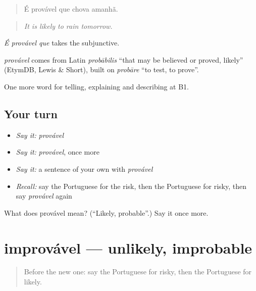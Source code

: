 \begin{quote}
É provável que chova amanhã.
\end{quote}

\begin{quote}
\emph{It is likely to rain tomorrow.}
\end{quote}

\emph{É provável que} takes the subjunctive.

\begin{cousinweb}
\emph{provável} comes from Latin \emph{probābilis} \textquotedblleft{}that may be believed or proved, likely\textquotedblright{} (EtymDB, Lewis \& Short), built on \emph{probāre} \textquotedblleft{}to test, to prove\textquotedblright{}.
\end{cousinweb}

\begin{grammarlens}[title={What you've built}]
One more word for telling, explaining and describing at B1.
\end{grammarlens}

\subsection*{Your turn}
\begin{itemize}
\raggedright
  \item \emph{Say it:} \emph{provável}
  \item \emph{Say it:} \emph{provável}, once more
  \item \emph{Say it:} a sentence of your own with \emph{provável}
  \item \emph{Recall:} say the Portuguese for the risk, then the Portuguese for risky, then say \emph{provável} again
\end{itemize}

\begin{tcolorbox}[breakable,colback=teal!4,colframe=teal!35!black,title={Before you move on}]
What does provável mean? (\textquotedblleft{}Likely, probable\textquotedblright{}.) Say it once more.
\end{tcolorbox}
\section[improvável]{improvável — unlikely, improbable}

\label{lesson:PT-C373-improvavel}



\begin{quote}
Before the new one: say the Portuguese for risky, then the Portuguese for likely.
\end{quote}

